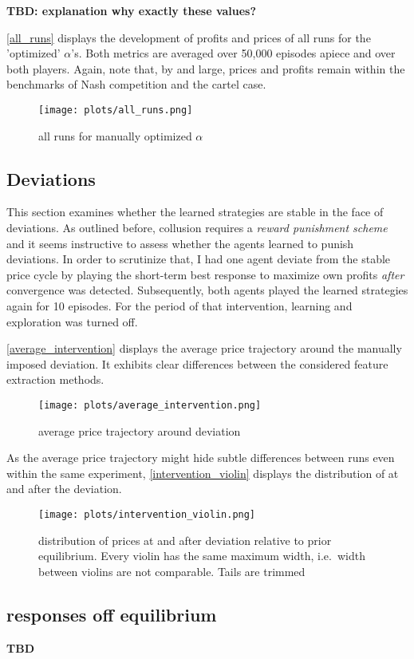 \textbf{TBD: explanation why exactly these values?}

\autoref{all_runs} displays the development of profits and prices of all runs for the 'optimized' $\alpha$'s. Both metrics are averaged over 50,000 episodes apiece and over both players. Again, note that, by and large, prices and profits remain within the benchmarks of Nash competition and the cartel case.

\begin{figure}
	\texttt{[image: plots/all\_runs.png]}
	\caption{all runs for manually optimized $\alpha$}
	\label{all_runs}
\end{figure}



\clearpage
\subsection{Deviations}

This section examines whether the learned strategies are stable in the face of deviations. As outlined before, collusion requires a \emph{reward punishment scheme} and it seems instructive to assess whether the agents learned to punish deviations. In order to scrutinize that, I had one agent deviate from the stable price cycle by playing the short-term best response to maximize own profits \emph{after} convergence was detected. Subsequently, both agents played the learned strategies again for 10 episodes. For the period of that intervention, learning and exploration was turned off.

\autoref{average_intervention} displays the average price trajectory around the manually imposed deviation. It exhibits clear differences between the considered feature extraction methods. 

\begin{figure}
	\texttt{[image: plots/average\_intervention.png]}
	\caption{average price trajectory around deviation}
	\label{average_intervention}
\end{figure}

As the average price trajectory might hide subtle differences between runs even within the same experiment, \autoref{intervention_violin} displays the distribution of at and after the deviation.


\begin{figure}
	\texttt{[image: plots/intervention\_violin.png]}
	\caption{distribution of prices at and after deviation relative to prior equilibrium. Every violin has the same maximum width, i.e.\ width between violins are not comparable. Tails are trimmed}
	\label{intervention_violin}
\end{figure}

\pagebreak
\subsection{responses off equilibrium}

\textbf{TBD}



